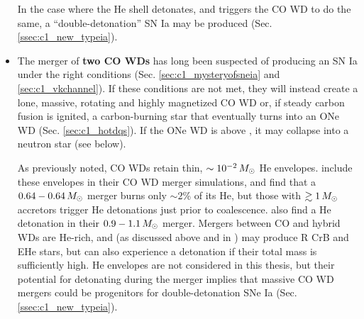 \begin{itemize}



In the case where the He shell detonates, and triggers the CO WD to do the same, a ``double-detonation'' SN Ia may be produced (Sec. \ref{ssec:c1_new_typeia}).

	\item The merger of {\bf two CO WDs} has long been suspected of producing an SN Ia under the right conditions (Sec. \ref{sec:c1_mysteryofsneia} and \ref{sec:c1_vkchannel}).  If these conditions are not met, they will instead create a lone, massive, rotating and highly magnetized CO WD or, if steady carbon fusion is ignited, a carbon-burning star that eventually turns into an ONe WD (Sec. \ref{sec:c1_hotdqs}).  If the ONe WD is above \Mch, it may collapse into a neutron star (see below).

{\charles As previously noted, CO WDs retain thin, $\sim10^{-2}\,\Msun$ He envelopes.  \cite{rask+12} include these envelopes in their CO WD merger simulations, and find that a $0.64-0.64\,\Msun$ merger burns only $\sim2$\% of its He, but those with $\gtrsim1\,\Msun$ accretors trigger He detonations just prior to coalescence.  \cite{pakm+13} also find a He detonation in their $0.9-1.1\,\Msun$ merger.  Mergers between CO and hybrid WDs are He-rich, and (as discussed above and in \citealt{dan+14}) may produce R CrB and EHe stars, but can also experience a detonation if their total mass is sufficiently high.  He envelopes are not considered in this thesis, but their potential for detonating during the merger implies that massive CO WD mergers could be progenitors for double-detonation SNe Ia (Sec. \ref{ssec:c1_new_typeia}).}


\end{itemize}
